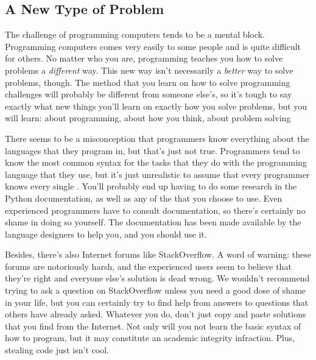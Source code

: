 \subsection{A New Type of Problem}
The challenge of programming computers tends to be a mental block. Programming computers comes very easily to some people and is quite difficult for others. No matter who you are, programming teaches you how to solve problems a \textit{different} way. This new way isn't necessarily a \textit{better} way to solve problems, though. The method that you learn on how to solve programming challenges will probably be different from someone else's, so it's tough to say exactly what new things you'll learn on exactly how you solve problems, but you will learn: about programming, about how you think, about problem solving\par
There seems to be a misconception that programmers know everything about the languages that they program in, but that's just not true. Programmers tend to know the most common syntax for the tasks that they do with the programming language that they use, but it's just unrealistic to assume that every programmer knows every single . You'll probably end up having to do some research in the Python documentation, as well as any of the  that you choose to use. Even experienced programmers have to consult documentation, so there's certainly no shame in doing so yourself. The documentation has been made available by the language designers to help you, and you should use it.\par
Besides, there's also Internet forums like StackOverflow. A word of warning: these forums are notoriously harsh, and the experienced users seem to believe that they're right and everyone else's solution is dead wrong. We wouldn't recommend trying to ask a question on StackOverflow unless you need a good dose of shame in your life, but you can certainly try to find help from answers to questions that others have already asked. Whatever you do, don't just copy and paste solutions that you find from the Internet. Not only will you not learn the basic syntax of how to program, but it may constitute an academic integrity infraction. Plus, stealing code just isn't cool.\par
